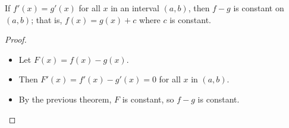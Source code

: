 \begin{frame}
\begin{corollary}
If $f'(x) = g'(x)$ for all $x$ in an interval $(a,b)$, then $f-g$ is constant on $(a,b)$; that is, $f(x) = g(x) + c$ where $c$ is constant.
\end{corollary}
\begin{proof}
\begin{itemize}
\item<2->  Let $F(x) = f(x) - g(x)$.
\item<3->  Then $F'(x) = f'(x) - g'(x) = 0$ for all $x$ in $(a,b)$.
\item<4->  By the previous theorem, $F$ is constant, so $f - g$ is constant.\qedhere
\end{itemize}
\end{proof}
\end{frame}
